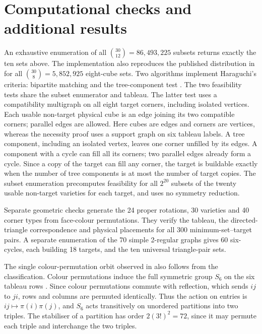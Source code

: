 \documentclass[11pt]{article}
\begin{document}
\section{Computational checks and additional results}
An exhaustive enumeration of all $\binom{30}{12}=86,493,225$ subsets returns
exactly the ten sets above. The implementation also reproduces the published
distribution in \cite[Table~2]{JR} for all
$\binom{30}{8}=5,852,925$ eight-cube sets.
Two algorithms implement Haraguchi's criteria: bipartite matching
\cite[Proposition~3]{H} and the tree-component test
\cite[Proposition~4]{H}. The two feasibility tests share the subset
enumerator and tableau. The latter test uses a compatibility multigraph on all
eight target corners, including isolated vertices. Each usable non-target
physical cube is an edge joining its two compatible corners; parallel
edges are allowed. Here cubes are edges and corners are vertices, whereas
the necessity proof uses a support graph on six tableau labels.
A tree component, including an isolated vertex, leaves one corner unfilled
by its edges. A component with a cycle can fill all its corners; two
parallel edges already form a cycle. Since a copy of the target can fill
any corner, the target is buildable exactly when the number of tree
components is at most the number of target copies. The subset enumeration
precomputes feasibility for all $2^{20}$ subsets of the twenty usable
non-target varieties for each target, and uses no symmetry reduction.

Separate geometric checks generate the 24 proper rotations, 30 varieties
and 40 corner types from face-colour permutations. They verify the tableau,
the directed-triangle correspondence and physical placements for all
300 minimum-set--target pairs. A separate enumeration of the 70 simple
2-regular graphs gives 60 six-cycles, each building 18 targets, and the ten
universal triangle-pair sets.

The single colour-permutation orbit observed in \cite[Section~6]{JR} also
follows from the classification. Colour permutations induce the full
symmetric group $S_6$ on the six tableau rows \cite[Lemma~3.1 and
Corollary~3.3]{B2017}. Since colour permutations commute with reflection,
which sends $ij$ to $ji$, rows and columns are permuted identically.
Thus the action on entries is $ij\mapsto\pi(i)\pi(j)$, and $S_6$ acts
transitively on unordered partitions into two triples. The stabiliser of a partition has order $2(3!)^2=72$, since
it may permute each triple and interchange the two triples.
\end{document}
